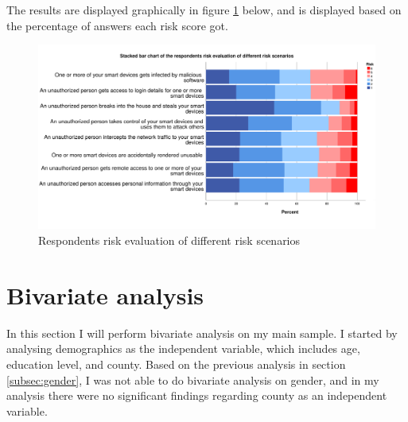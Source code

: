 The results are displayed graphically in figure \ref{fig:risk perception} below, and is displayed based on the percentage of answers each risk score got. 
\begin{figure}[!h]
    \centering
    \includegraphics[scale=0.4]{figures/diagrams/risk_perception.pdf}
    \caption{Respondents risk evaluation of different risk scenarios}
    \label{fig:risk perception}
\end{figure}

\section{Bivariate analysis}
In this section I will perform bivariate analysis on my main sample. I started by analysing demographics as the independent variable, which includes age, education level, and county. Based on the previous analysis in section \ref{subsec:gender}, I was not able to do bivariate analysis on gender, and in my analysis there were no significant findings regarding county as an independent variable. 


